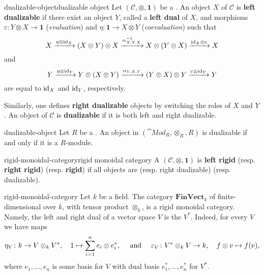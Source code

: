 \begin{topic}{dualizable-object}{dualizable object}
    Let $(\mathcal{C}, \otimes, \textbf{1})$ be a . An object $X$ of $\mathcal{C}$ is \textbf{left dualizable} if there exist an object $Y$, called a \textbf{left dual} of $X$, and morphisms $\varepsilon \colon Y \otimes X \to \textbf{1}$ (\textit{evaluation}) and $\eta \colon \textbf{1} \to X \otimes Y$ (\textit{coevaluation}) such that
    \[ X \xrightarrow{\eta \otimes \textup{id}_X} (X \otimes Y) \otimes X \xrightarrow{\alpha_{X, Y, X}^{-1}} X \otimes (Y \otimes X) \xrightarrow{\textup{id}_X \otimes \varepsilon} X \]
    and
    \[ Y \xrightarrow{\eta \otimes \textup{id}_Y} Y \otimes (X \otimes Y) \xrightarrow{\alpha_{Y, X, Y}} (Y \otimes X) \otimes Y \xrightarrow{\varepsilon \otimes \textup{id}_Y} Y \]
    are equal to $\textup{id}_X$ and $\textup{id}_Y$, respectively.
    
    Similarly, one defines \textbf{right dualizable} objects by switching the roles of $X$ and $Y$.
    An object of $\mathcal{C}$ is \textbf{dualizable} if it is both left and right dualizable.
\end{topic}

\begin{example}{dualizable-object}
    Let $R$ be a . An object in $(\cat{Mod}_R, \otimes_R, R)$ is dualizable if and only if it is a   $R$-module.
\end{example}

\begin{topic}{rigid-monoidal-category}{rigid monoidal category}
    A  $(\mathcal{C}, \otimes, \textbf{1})$ is \textbf{left rigid} (resp. \textbf{right rigid}) (resp. \textbf{rigid}) if all objects are  (resp. right dualizable) (resp. dualizable).
\end{topic}

\begin{example}{rigid-monoidal-category}
    Let $k$ be a field. The category $\textbf{FinVect}_k$ of finite-dimensional  over $k$, with tensor product $\otimes_k$, is a rigid monoidal category. Namely, the left and right dual of a vector space $V$ is the  $V^*$. Indeed, for every $V$ we have maps
    \[ \eta_V \colon k \to V \otimes_k V^*, \quad 1 \mapsto \sum_{i = 1}^{n} e_i \otimes e^*_i , \quad \textup{ and } \quad \varepsilon_V \colon V^* \otimes_k V \to k, \quad f \otimes v \mapsto f(v) , \]
    where $e_1, \ldots, e_n$ is some basis for $V$ with dual basis $e^*_1, \ldots, e^*_n$ for $V^*$.
\end{example}

